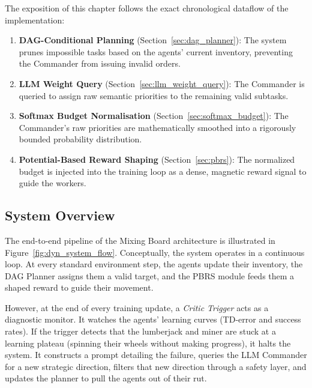 The exposition of this chapter follows the exact chronological dataflow of the implementation:
\begin{enumerate}
    \item \textbf{DAG-Conditional Planning} (Section~\ref{sec:dag_planner}): The system prunes impossible tasks based on the agents' current inventory, preventing the Commander from issuing invalid orders.
    \item \textbf{LLM Weight Query} (Section~\ref{sec:llm_weight_query}): The Commander is queried to assign raw semantic priorities to the remaining valid subtasks.
    \item \textbf{Softmax Budget Normalisation} (Section~\ref{sec:softmax_budget}): The Commander's raw priorities are mathematically smoothed into a rigorously bounded probability distribution.
    \item \textbf{Potential-Based Reward Shaping} (Section~\ref{sec:pbrs}): The normalized budget is injected into the training loop as a dense, magnetic reward signal to guide the workers.
\end{enumerate}

\subsection{System Overview}
\label{sec:dyn_overview}

The end-to-end pipeline of the Mixing Board architecture is illustrated in Figure~\ref{fig:dyn_system_flow}. Conceptually, the system operates in a continuous loop. At every standard environment step, the agents update their inventory, the DAG Planner assigns them a valid target, and the PBRS module feeds them a shaped reward to guide their movement.

However, at the end of every training update, a \emph{Critic Trigger} acts as a diagnostic monitor. It watches the agents' learning curves (TD-error and success rates). If the trigger detects that the lumberjack and miner are stuck at a learning plateau (spinning their wheels without making progress), it halts the system. It constructs a prompt detailing the failure, queries the LLM Commander for a new strategic direction, filters that new direction through a safety layer, and updates the planner to pull the agents out of their rut.

